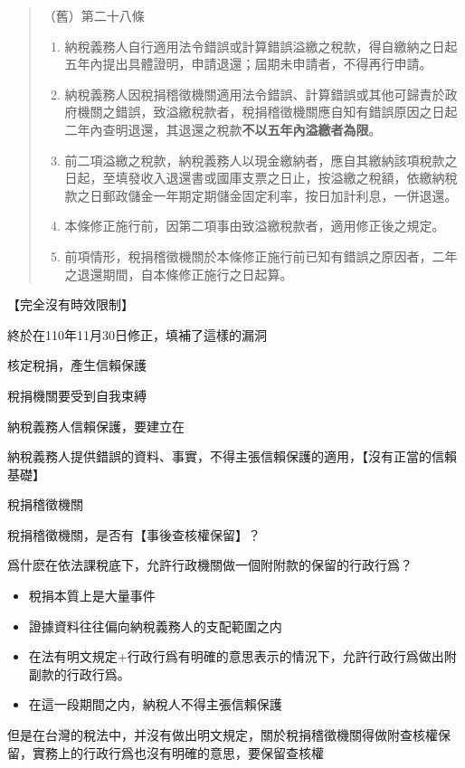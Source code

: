 \documentclass[]{ctexbook}
\providecommand{\tightlist}{%
  \setlength{\itemsep}{0pt}\setlength{\parskip}{0pt}}
\begin{document}
\begin{quote}
（舊）第二十八條

\begin{enumerate}
\def\labelenumi{\arabic{enumi}.}
\tightlist
\item
  納稅義務人自行適用法令錯誤或計算錯誤溢繳之稅款，得自繳納之日起五年內提出具體證明，申請退還；屆期未申請者，不得再行申請。
\item
  納稅義務人因稅捐稽徵機關適用法令錯誤、計算錯誤或其他可歸責於政府機關之錯誤，致溢繳稅款者，稅捐稽徵機關應自知有錯誤原因之日起二年內查明退還，其退還之稅款\textbf{不以五年內溢繳者為限}。
\item
  前二項溢繳之稅款，納稅義務人以現金繳納者，應自其繳納該項稅款之日起，至填發收入退還書或國庫支票之日止，按溢繳之稅額，依繳納稅款之日郵政儲金一年期定期儲金固定利率，按日加計利息，一併退還。
\item
  本條修正施行前，因第二項事由致溢繳稅款者，適用修正後之規定。
\item
  前項情形，稅捐稽徵機關於本條修正施行前已知有錯誤之原因者，二年之退還期間，自本條修正施行之日起算。
\end{enumerate}
\end{quote}

【完全沒有時效限制】

終於在110年11月30日修正，填補了這樣的漏洞

核定稅捐，產生信賴保護

稅捐機關要受到自我束縛

納稅義務人信賴保護，要建立在

納稅義務人提供錯誤的資料、事實，不得主張信賴保護的適用，【沒有正當的信賴基礎】

稅捐稽徵機關

稅捐稽徵機關，是否有【事後查核權保留】？

爲什麽在依法課稅底下，允許行政機關做一個附附款的保留的行政行爲？

\begin{itemize}
\tightlist
\item
  稅捐本質上是大量事件
\item
  證據資料往往偏向納稅義務人的支配範圍之内
\item
  在法有明文規定+行政行爲有明確的意思表示的情況下，允許行政行爲做出附副款的行政行爲。
\item
  在這一段期間之内，納稅人不得主張信賴保護
\end{itemize}

但是在台灣的稅法中，并沒有做出明文規定，關於稅捐稽徵機關得做附查核權保留，實務上的行政行爲也沒有明確的意思，要保留查核權
\end{document}
